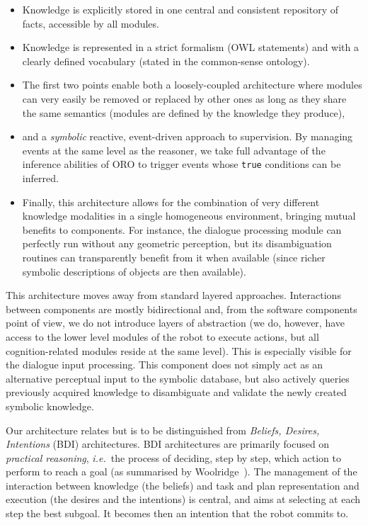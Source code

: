 \documentclass[letterpaper, 10 pt, conference]{ieeeconf}  %
\newcommand{\ie}{{\textit{i.e.\ }}}
\begin{document}
\begin{itemize}
    
    \item{Knowledge is explicitly stored in one central and consistent
    repository of facts, accessible by all modules.} 

    \item{Knowledge is represented in a strict formalism (OWL statements) and
    with a clearly defined vocabulary (stated in the common-sense ontology).}

    \item{The first two points enable both a loosely-coupled architecture where
    modules can very easily be removed or replaced by other ones as long as
    they share the same semantics (modules are defined by the knowledge they
    produce),} 

    \item{and a \emph{symbolic} reactive, event-driven approach to supervision.
    By managing events at the same level as the reasoner, we take full
    advantage of the inference abilities of ORO to trigger events whose
    \texttt{true} conditions can be inferred.} 

    \item{Finally, this architecture allows for the combination of very
    different knowledge modalities in a single homogeneous environment,
    bringing mutual benefits to components. For instance, the dialogue
    processing module can perfectly run without any geometric
    perception, but its disambiguation routines can transparently
    benefit from it when available (since richer symbolic descriptions of
    objects are then available).}

\end{itemize}

This architecture moves away from standard layered approaches. Interactions
between components are mostly bidirectional and, from the software components
point of view, we do not introduce layers of abstraction (we do, however, have
access to the lower level modules of the robot to execute actions, but all
cognition-related modules reside at the same level). This is especially visible
for the dialogue input processing. This component does not simply act as an
alternative perceptual input to the symbolic database, but also actively
queries previously acquired knowledge to disambiguate and validate the newly
created symbolic knowledge.

Our architecture relates but is to be distinguished from \emph{Beliefs,
Desires, Intentions} (BDI) architectures. BDI architectures are primarily
focused on \emph{practical reasoning}, \ie the process of deciding, step by
step, which action to perform to reach a goal (as summarised by
Woolridge~\cite{Woolridge1999}). The management of the interaction between
knowledge (the beliefs) and task and plan representation and execution (the
desires and the intentions) is central, and aims at selecting at each step the
best subgoal. It becomes then an intention that the robot commits to.
\end{document}
